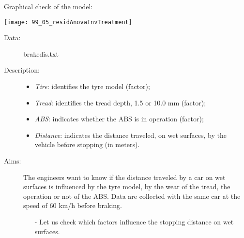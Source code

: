 \begin{frame}
   Graphical check of the model:\\
  \vspace{.1cm}
  \begin{center}
    \texttt{[image: 99\_05\_residAnovaInvTreatment]}
    \end{center}
\end{frame}





\begin{frame}
  \begin{description}
    \item[Data: ]brakedis.txt \\ 
    \item[Description: ]
      \begin{footnotesize}
        \begin{itemize}
          \item \textit{Tire}: identifies the tyre model (factor);
          \item \textit{Tread}: identifies the tread depth, 1.5 or 10.0 mm (factor);
          \item \textit{ABS}: indicates whether the ABS is in operation (factor);
          \item \textit{Distance}: indicates the distance traveled, on wet surfaces, by the vehicle before stopping (in meters). 
        \end{itemize}
      \end{footnotesize}
    \item[Aims: ]
      \begin{footnotesize}
        The engineers want to know if the distance traveled by a car on wet surfaces is influenced by the tyre model, by the wear of the tread, the operation or not of the ABS. Data are collected with the same car at the speed of 60 km/h before braking.
      \begin{itemize}
          \item[-] Let us check which factors influence the stopping distance on wet surfaces.
        \end{itemize}
      \end{footnotesize}
  \end{description}
\end{frame}

